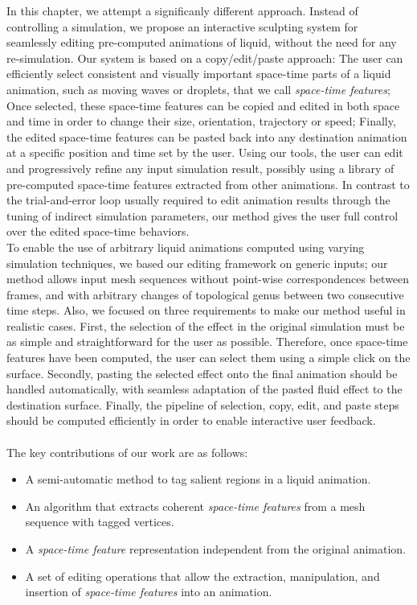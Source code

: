 In this chapter, we attempt a significanly different approach.
Instead of controlling a simulation, we propose an interactive sculpting system for seamlessly editing pre-computed animations of liquid, without the need for any re-simulation. 
Our system is based on a copy/edit/paste approach:
The user can efficiently select consistent and visually important space-time parts of a liquid animation, such as moving waves or droplets, that we call \emph{space-time features};
Once selected, these space-time features can be copied and edited in both space and time in order to change their size, orientation, trajectory or speed;
Finally, the edited space-time features can be pasted back into any destination animation at a specific position and time set by the user.
Using our tools, the user can edit and progressively refine any input simulation result, possibly using a library of pre-computed space-time features extracted from other animations. 
In contrast to the trial-and-error loop usually required to edit animation results through the tuning of indirect simulation parameters, our method gives the user full control over the edited space-time behaviors. 
\\
To enable the use of arbitrary liquid animations computed using varying simulation techniques, we based our editing framework on generic inputs; 
our method allows input mesh sequences without point-wise correspondences between frames, and with arbitrary changes of topological genus between two consecutive time steps.
Also, we focused on three requirements to make our method useful in realistic cases.
First, the selection of the effect in the original simulation must be as simple and straightforward for the user as possible. 
Therefore, once space-time features have been computed, the user can select them using a simple click on the surface.
Secondly, pasting the selected effect onto the final animation should be handled automatically, with seamless adaptation of the pasted fluid effect to the destination surface. 
Finally, the pipeline of selection, copy, edit, and paste steps should be computed efficiently in order to enable interactive user feedback. 
\\ \\
The key contributions of our work are as follows:
\begin{itemize}
    \item A semi-automatic method to tag salient regions in a liquid animation.
    \item An algorithm that extracts coherent \emph{space-time features} from a mesh sequence with tagged vertices.
    \item A \emph{space-time feature} representation independent from the original animation.
    \item A set of editing operations that allow the extraction, manipulation, and insertion of \emph{space-time features} into an animation.
\end{itemize}
